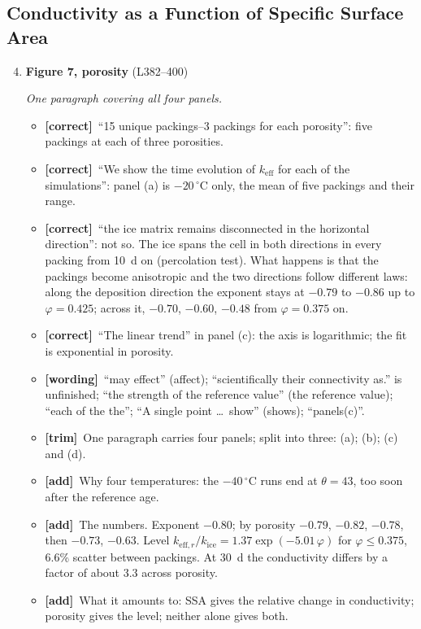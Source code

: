 \documentclass[11pt]{article}
\newcommand{\Pg}[3]{\item \textbf{#1} {\small(#2)}\par\textit{#3}}
\newcommand{\tC}{\textcolor{miss}{\textbf{[correct]}}\ }
\newcommand{\tG}{\textcolor{stale}{\textbf{[wording]}}\ }
\newcommand{\tT}{\textcolor{cut}{\textbf{[trim]}}\ }
\newcommand{\tA}{\textcolor{have}{\textbf{[add]}}\ }
\begin{document}
\subsection{Conductivity as a Function of Specific Surface Area}
\begin{enumerate}
\setcounter{enumi}{3}
\Pg{Figure 7, porosity}{L382--400}{One paragraph covering all four panels.}
  \begin{itemize}
  \item \tC ``15 unique packings--3 packings for each porosity'': five
    packings at each of three porosities.
  \item \tC ``We show the time evolution of $k_{\mathrm{eff}}$ for each of
    the simulations'': panel (a) is $-20\,^{\circ}$C only, the mean of five
    packings and their range.
  \item \tC ``the ice matrix remains disconnected in the horizontal
    direction'': not so. The ice spans the cell in both directions in every
    packing from 10~d on (percolation test). What happens is that the
    packings become anisotropic and the two directions follow different
    laws: along the deposition direction the exponent stays at $-0.79$ to
    $-0.86$ up to $\varphi = 0.425$; across it, $-0.70$, $-0.60$, $-0.48$
    from $\varphi = 0.375$ on.
  \item \tC ``The linear trend'' in panel (c): the axis is logarithmic; the
    fit is exponential in porosity.
  \item \tG ``may effect'' (affect); ``scientifically their connectivity
    as.'' is unfinished; ``the strength of the reference value'' (the
    reference value); ``each of the the''; ``A single point \ldots\ show''
    (shows); ``panels(c)''.
  \item \tT One paragraph carries four panels; split into three: (a); (b);
    (c) and (d).
  \item \tA Why four temperatures: the $-40\,^{\circ}$C runs end at $\theta =
    43$, too soon after the reference age.
  \item \tA The numbers. Exponent $-0.80$; by porosity $-0.79$, $-0.82$,
    $-0.78$, then $-0.73$, $-0.63$. Level $k_{\mathrm{eff},r}/
    k_{\mathrm{ice}} = 1.37\exp(-5.01\,\varphi)$ for $\varphi \le 0.375$,
    6.6\% scatter between packings. At 30~d the conductivity differs by a
    factor of about 3.3 across porosity.
  \item \tA What it amounts to: SSA gives the relative change in
    conductivity; porosity gives the level; neither alone gives both.
  \end{itemize}

\end{enumerate}
\end{document}
